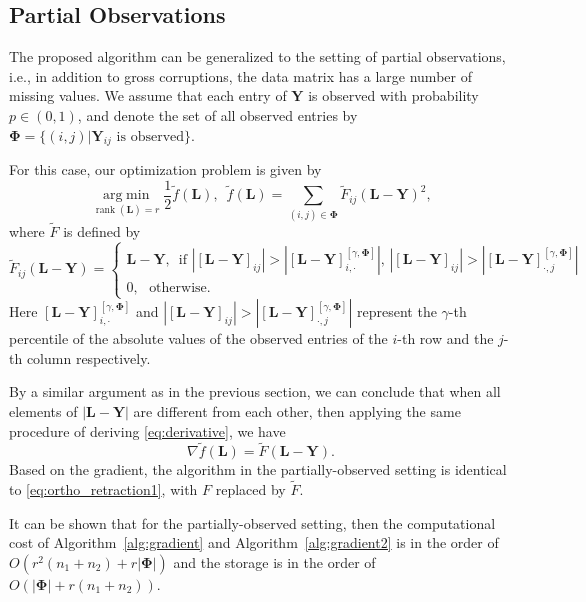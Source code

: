 \documentclass[12pt]{article}
\newcommand{\grad}{\nabla}
\newcommand{\argmin}{\operatorname*{arg\; min}}
\newcommand{\rank}{\operatorname{rank}}
\newcommand{\bL}{\boldsymbol{L}}
\def\bY{\boldsymbol{Y}}
\theoremstyle{plain}
\theoremstyle{definition}
\theoremstyle{plain}
\theoremstyle{plain}
\theoremstyle{remark}
\begin{document}
\subsection{Partial Observations}\label{sec:partial}
The proposed algorithm can be generalized to the setting of  partial observations, i.e., in addition to gross corruptions,
the data matrix has a large number of missing values. We assume that each entry of $\bY$ is observed with probability $p\in(0,1)$, and denote the set of all observed entries by $\mathbf{\Phi}=\{(i,j)|\bY_{ij}\,\,\text{is observed}\}$. 

For this case, our optimization problem is given by
\[
\argmin_{\rank(\bL)=r}\frac{1}{2}\tilde{f}(\bL),\,\,\,\tilde{f}(\bL)=\sum_{(i,j)\in\mathbf{\Phi}}\tilde{F}_{ij}(\bL-\bY)^2,
\]
where $\tilde{F}$ is defined by
\begin{equation}\label{eq:threshold2}
\tilde{F}_{ij}(\bL-\bY)=\begin{cases}\bL-\bY,\,\,\,\text{if $|[\bL-\bY]_{ij}|>|[\bL-\bY]_{i,\cdot}^{[\gamma,\mathbf{\Phi}]}|$, $|[\bL-\bY]_{ij}|>|[\bL-\bY]_{\cdot,j}^{[\gamma,\mathbf{\Phi}]}|$}\\0,\,\,\,\,\text{otherwise}.\end{cases}
\end{equation}
Here $[\bL-\bY]_{i,\cdot}^{[\gamma,\mathbf{\Phi}]}$ and $|[\bL-\bY]_{ij}|>|[\bL-\bY]_{\cdot,j}^{[\gamma,\mathbf{\Phi}]}|$ represent the $\gamma$-th percentile of the absolute values of the observed entries of the $i$-th row and the $j$-th column respectively. 


By a similar argument as in the previous section, we can conclude that when all elements of $|\bL-\bY|$ are different from each other, then applying the same procedure of deriving \eqref{eq:derivative}, we have
\[
\grad\tilde{f}(\bL)=\tilde{F}(\bL-\bY).
\]
Based on the gradient, the algorithm in the partially-observed setting is identical to \eqref{eq:ortho_retraction1}, with $F$ replaced by $\tilde{F}$.

It can be shown that for the partially-observed setting, then the computational cost of Algorithm~\ref{alg:gradient} and Algorithm~\ref{alg:gradient2} is in the order of $O(r^2(n_1+n_2)+r|\mathbf{\Phi}|)$ and the storage is in the order of $O(|\mathbf{\Phi}|+r(n_1+n_2))$. 
\end{document}
